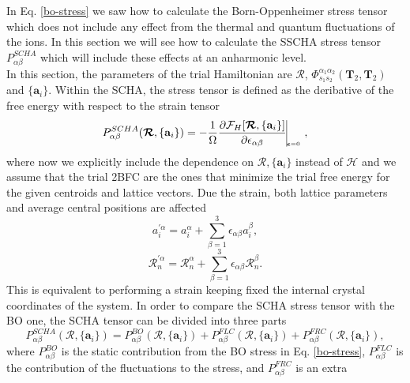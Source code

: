 In Eq. \ref{bo-stress} we saw how to calculate the Born-Oppenheimer stress tensor which does not include any effect from the thermal and quantum fluctuations of the ions. In this section we will see how to calculate 
the SSCHA stress tensor $P_{\alpha\beta}^{SCHA}$ which will include these effects at an anharmonic level. \\

In this section, the parameters of the trial Hamiltonian are $\boldsymbol{\mathcal{R}}$, $\Phi_{s_{1}s_{2}}^{\alpha_{1}\alpha_{2}}(\mathbf{T}_{2},\mathbf{T}_{2})$ and $\{\mathbf{a}_{i}\}$. Within the SCHA, the stress 
tensor is defined as the deribative of the free energy with respect to the strain tensor
\begin{equation}
\label{scha-stress}
 P_{\alpha\beta}^{SCHA}(\boldsymbol{\mathcal{R}},\{\mathbf{a}_{i}\})=-\frac{1}{\Omega}\frac{\partial\mathcal{F}_{H}[\boldsymbol{\mathcal{R}},\{\mathbf{a}_{i}\}]}{\partial\epsilon_{\alpha\beta}}\vline_{_{_{_{_{_{_{_{
\boldsymbol{\epsilon}=0}}}}}}}}, 
\end{equation}  
where now we explicitly include the dependence on $\boldsymbol{\mathcal{R}},\{\mathbf{a}_{i}\}$ instead of $\mathcal{H}$ and we assume that the trial 2BFC are the ones that minimize the trial free energy for the given centroids and 
lattice vectors. Due the strain, both lattice parameters and average central positions are affected
\begin{equation}
a_{i}^{'\alpha}=a_{i}^{\alpha}+\sum_{\beta=1}^{3}\epsilon_{\alpha\beta}a_{i}^{\beta},
\end{equation}
\begin{equation}
\mathcal{R}_{n}^{'\alpha}=\mathcal{R}_{n}^{\alpha}+\sum_{\beta=1}^{3}\epsilon_{\alpha\beta}\mathcal{R}_{n}^{\beta}.
\end{equation}
This is equivalent to performing a strain keeping fixed the internal crystal coordinates of the system. In order to compare the SCHA stress tensor with the BO one, the SCHA tensor can be divided into three 
parts\cite{monacelli2018pressure}
\begin{equation}
 P_{\alpha\beta}^{SCHA}(\boldsymbol{\mathcal{R}},\{\mathbf{a}_{i}\})=P_{\alpha\beta}^{BO}(\boldsymbol{\mathcal{R}},\{\mathbf{a}_{i}\})+P_{\alpha\beta}^{FLC}(\boldsymbol{\mathcal{R}},\{\mathbf{a}_{i}\})+
 P_{\alpha\beta}^{FRC}(\boldsymbol{\mathcal{R}},\{\mathbf{a}_{i}\}),
\end{equation}
where $P_{\alpha\beta}^{BO}$ is the static contribution from the BO stress in Eq. \ref{bo-stress}, $P_{\alpha\beta}^{FLC}$ is the contribution of the fluctuations to the stress, and $P_{\alpha\beta}^{FRC}$ is an extra 
